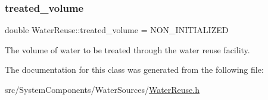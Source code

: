 \subsubsection{\texorpdfstring{treated\+\_\+volume}{treated\_volume}}
{\footnotesize\ttfamily double Water\+Reuse\+::treated\+\_\+volume = N\+O\+N\+\_\+\+I\+N\+I\+T\+I\+A\+L\+I\+Z\+ED\hspace{0.3cm}{\ttfamily [private]}}



The volume of water to be treated through the water reuse facility. 



The documentation for this class was generated from the following file\+:\begin{DoxyCompactItemize}
\item 
src/\+System\+Components/\+Water\+Sources/\mbox{\hyperlink{WaterReuse_8h}{Water\+Reuse.\+h}}\end{DoxyCompactItemize}
